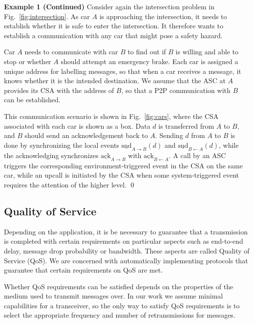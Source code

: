 \documentclass{sig-alternate}
\newenvironment{excont}[1]{\textbf{Example 1 (#1)}}{\qed}
\newcommand{\locev}[1]{\underline{#1}}
\newcommand{\snd}{\mathrm{snd}}
\newcommand{\ack}{\mathrm{ack}}
\newcommand{\env}[4]{\locev{#1}_{{#2} \rightarrow {#3}}(#4)}
\newcommand{\eenv}[3]{\locev{#1}_{{#2} \rightarrow {#3}}}
\newcommand{\sys}[4]{\locev{#1}_{{#2} \leftarrow {#3}}(#4)}
\newcommand{\esys}[3]{\locev{#1}_{{#2} \leftarrow {#3}}}
\newcommand{\fig}[1]{Fig.\ \ref{fig:#1}}
\begin{document}
\begin{excont}{Continued}
Consider again the intersection problem in \fig{intersection}. As car $A$ is approaching the intersection, it needs to establish whether it is safe to enter the intersection. It therefore wants to establish a communication with any car that might pose a safety hazard.

Car $A$ needs to communicate with car $B$ to find out if $B$ is willing and able to stop or whether $A$ should attempt an emergency brake. Each car is assigned a unique address for labelling messages, so that when a car receives a message, it knows whether it is the intended destination. We assume that the ASC at $A$ provides its CSA with the address of $B$, so that a P2P communication with $B$ can be established.

This communication scenario is shown in \fig{cars}, where the CSA associated with each car is shown as a box. Data $d$ is transferred from $A$ to $B$, and $B$ should send an acknowledgement back to $A$. Sending $d$ from $A$ to $B$ is done by synchronizing the local events $\env{\snd}{A}{B}{d}$ and $\sys{\snd}{B}{A}{d}$, while the acknowledging synchronizes $\eenv{\ack}{A}{B}$ with $\esys{\ack}{B}{A}$. A call by an ASC triggers the corresponding environment-triggered event in the CSA on the same car, while an upcall is initiated by the CSA when some system-triggered event requires the attention of the higher level.
\end{excont}



\subsection{Quality of Service} \label{sec:QoS}

Depending on the application, it is be necessary to guarantee that a transmission is completed with certain requirements on particular aspects such as end-to-end delay, message drop probability or bandwidth. These aspects are called Quality of Service (QoS). We are concerned with automatically implementing protocols that guarantee that certain requirements on QoS are met.

Whether QoS requirements can be satisfied depends on the properties of the medium used to transmit messages over. In our work we assume minimal capabilities for a transceiver, so the only way to satisfy QoS requirements is to select the appropriate frequency and number of retransmissions for messages.
\end{document}
